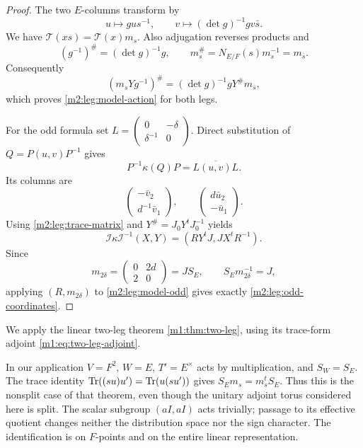 \begin{proof}
The two $E$-columns transform by
\[
 u\longmapsto gu s^{-1},\qquad
 v\longmapsto(\det g)^{-1}gv\bar s.
\]
We have $\mathcal T(xs)=\mathcal T(x)m_s$. Also adjugation reverses
products and
\[
 (g^{-1})^\#=(\det g)^{-1}g,
 \qquad m_s^\#=N_{E/F}(s)m_s^{-1}=m_{\bar s}.
\]
Consequently
\[
 (m_sYg^{-1})^\#=(\det g)^{-1}gY^\#m_{\bar s},
\]
which proves \eqref{m2:leg:model-action} for both legs.

For the odd formula set
$L=\left(\begin{smallmatrix}0&-\delta\\\delta^{-1}&0\end{smallmatrix}\right)$.
Direct substitution of $Q=P(u,v)P^{-1}$ gives
\[
 P^{-1}\kappa(Q)P=L\overline{(u,v)}L.
\]
Its columns are
\[
 \begin{pmatrix}-\bar v_2\\d^{-1}\bar v_1\end{pmatrix},
 \qquad
 \begin{pmatrix}d\bar u_2\\-\bar u_1\end{pmatrix}.
\]
Using \eqref{m2:leg:trace-matrix} and
$Y^\#=J_0Y^tJ_0^{-1}$ yields
\begin{equation}\label{m2:leg:odd-coordinates}
 \mathcal I\kappa\mathcal I^{-1}(X,Y)
       =(RY^tJ,JX^tR^{-1}).
\end{equation}
Since
\[
 m_{2\delta}=\begin{pmatrix}0&2d\\2&0\end{pmatrix}=JS_E,
 \qquad S_Em_{2\delta}^{-1}=J,
\]
applying $(R,m_{2\delta})$ to \eqref{m2:leg:model-odd} gives exactly
\eqref{m2:leg:odd-coordinates}.
\end{proof}

We apply the linear two-leg theorem \cref{m1:thm:two-leg}, using
its trace-form adjoint \eqref{m1:eq:two-leg-adjoint}.

In our application
$V=F^2$, $W=E$, $T'=E^\times$ acts by multiplication, and
$S_W=S_E$. The trace identity
$\operatorname{Tr}((su)u')=\operatorname{Tr}(u(su'))$ gives
$S_Em_s=m_s^tS_E$. Thus this is the nonsplit case of that theorem,
even though the unitary adjoint torus considered here is split.
The scalar subgroup $(aI,aI)$ acts trivially; passage to its
effective quotient changes neither the distribution space nor the
sign character. The identification is on $F$-points and on the entire
linear representation.


